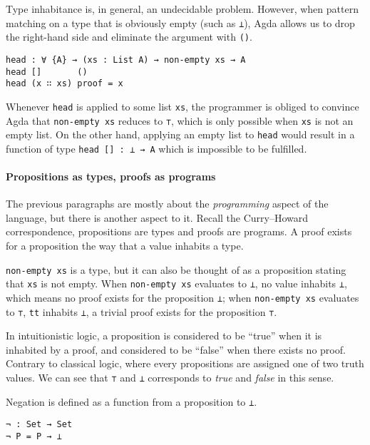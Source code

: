 \documentclass[\main/thesis.tex]{subfiles}
\begin{document}
Type inhabitance is, in general, an undecidable problem.
However, when pattern matching on a type that is obviously empty (such as {\lstinline|⊥|}),
Agda allows us to drop the right-hand side and eliminate the argument with {\lstinline|()|}.

\begin{lstlisting}
head : ∀ {A} → (xs : List A) → non-empty xs → A
head []       ()
head (x ∷ xs) proof = x
\end{lstlisting}

Whenever {\lstinline|head|} is applied to some list {\lstinline|xs|},
the programmer is obliged to convince Agda that {\lstinline|non-empty xs|}
reduces to {\lstinline|⊤|},
which is only possible when {\lstinline|xs|} is not an empty list.
On the other hand, applying an empty list to {\lstinline|head|} would result in
a function of type {\lstinline|head [] : ⊥ → A|} which is impossible to
be fulfilled.

\paragraph{Propositions as types, proofs as programs}

The previous paragraphs are mostly about the \textit{programming}
aspect of the language, but there is another aspect to it.
Recall the Curry–Howard correspondence, propositions are types and proofs are
programs. A proof exists for a proposition the way that a value inhabits a type.

{\lstinline|non-empty xs|} is a type, but it can also be thought of as a
proposition stating that {\lstinline|xs|} is not empty.
When {\lstinline|non-empty xs|} evaluates to {\lstinline|⊥|}, no value inhabits
{\lstinline|⊥|}, which means no proof exists for the proposition {\lstinline|⊥|};
when {\lstinline|non-empty xs|} evaluates to {\lstinline|⊤|}, {\lstinline|tt|}
inhabits {\lstinline|⊥|}, a trivial proof exists for the proposition {\lstinline|⊤|}.

In intuitionistic logic, a proposition is considered to be ``true'' when it is
inhabited by a proof, and considered to be ``false'' when there exists no proof.
Contrary to classical logic, where every propositions are assigned one of two truth values.
We can see that {\lstinline|⊤|} and {\lstinline|⊥|} corresponds to \textit{true}
and \textit{false} in this sense.

Negation is defined as a function from a proposition to {\lstinline|⊥|}.

\begin{lstlisting}
¬ : Set → Set
¬ P = P → ⊥
\end{lstlisting}
\end{document}
